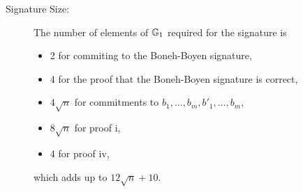
\begin{description}
\item[Signature Size:] The number of elements of $\mathbb{G}_1$ required  for the signature is
\begin{itemize}
\item 2 for commiting to the Boneh-Boyen signature,
\item 4 for the proof that the Boneh-Boyen signature is correct,
\item $4\sqrt{n}$ for commitments to $b_1,\ldots,b_m,b'_1,\ldots,b_m$,
\item $8\sqrt{n}$ for proof i,
\item $4$ for proof iv,
\end{itemize}
which adds up to $12\sqrt{n}+10$.


\end{description}
